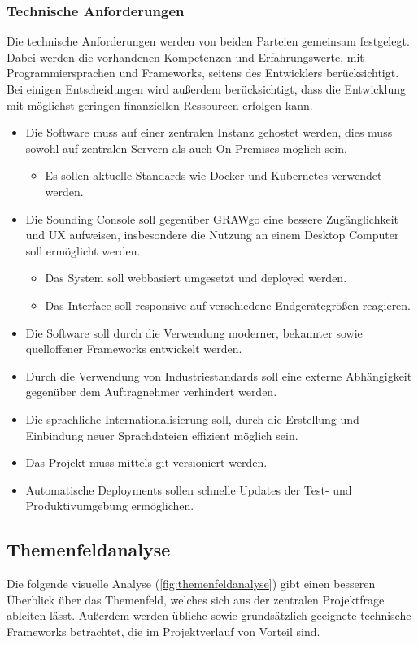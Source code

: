 \subsubsection{Technische Anforderungen}
Die technische Anforderungen werden von beiden Parteien gemeinsam festgelegt.
Dabei werden die vorhandenen Kompetenzen und Erfahrungswerte, mit Programmiersprachen und Frameworks, seitens des Entwicklers berücksichtigt.
Bei einigen Entscheidungen wird außerdem berücksichtigt, dass die Entwicklung mit möglichst geringen finanziellen Ressourcen erfolgen kann.
\begin{itemize}
    \item Die Software muss auf einer zentralen Instanz gehostet werden, dies muss sowohl auf zentralen Servern als auch On-Premises möglich sein.
    \begin{itemize}
        \item Es sollen aktuelle Standards wie Docker und Kubernetes verwendet werden.
    \end{itemize}
    \item Die Sounding Console soll gegenüber GRAWgo eine bessere Zugänglichkeit und UX aufweisen, insbesondere die Nutzung an einem Desktop Computer soll ermöglicht werden.
    \begin{itemize}
        \item Das System soll webbasiert umgesetzt und deployed werden.
        \item Das Interface soll responsive auf verschiedene Endgerätegrößen reagieren.
    \end{itemize}
    \item Die Software soll durch die Verwendung moderner, bekannter sowie quelloffener Frameworks entwickelt werden.
    \item Durch die Verwendung von Industriestandards soll eine externe Abhängigkeit gegenüber dem Auftragnehmer verhindert werden.
    \item Die sprachliche Internationalisierung soll, durch die Erstellung und Einbindung neuer Sprachdateien effizient möglich sein.
    \item Das Projekt muss mittels git versioniert werden.
    \item Automatische Deployments sollen schnelle Updates der Test- und Produktivumgebung ermöglichen.
\end{itemize}
\newpage

\subsection{Themenfeldanalyse}
Die folgende visuelle Analyse (\ref{fig:themenfeldanalyse}) gibt einen besseren Überblick über das Themenfeld, welches sich aus der zentralen Projektfrage ableiten lässt.
Außerdem werden übliche sowie grundsätzlich geeignete technische Frameworks betrachtet, die im Projektverlauf von Vorteil sind.

